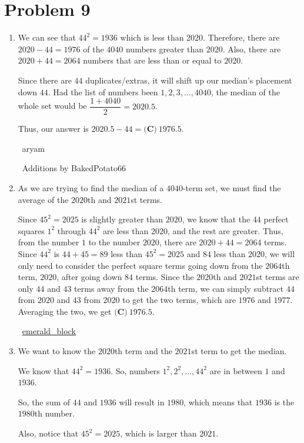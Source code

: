 \documentclass{article}%
\begin{document}
\section*{Problem 9}%
\label{sec:Problem9}%
\begin{enumerate}%
\item%
We can see that $44^2=1936$ which is less than 2020. Therefore, there are $2020-44=1976$ of the $4040$ numbers greater than $2020$. Also, there are $2020+44=2064$ numbers that are less than or equal to $2020$. 

Since there are $44$ duplicates/extras, it will shift up our median's placement down $44$. Had the list of numbers been $1,2,3, \dots, 4040$, the median of the whole set would be $\dfrac{1+4040}{2}=2020.5$. 

Thus, our answer is $2020.5-44=\boxed{\textbf{(C)}\ 1976.5}$.

~aryam

~Additions by BakedPotato66

%
\item%
As we are trying to find the median of a $4040$-term set, we must find the average of the $2020$th and $2021$st terms.

Since $45^2 = 2025$ is slightly greater than $2020$, we know that the $44$ perfect squares $1^2$ through $44^2$ are less than $2020$, and the rest are greater. Thus, from the number $1$ to the number $2020$, there are $2020 + 44 = 2064$ terms. Since $44^2$ is $44 + 45 = 89$ less than $45^2 = 2025$ and $84$ less than $2020$, we will only need to consider the perfect square terms going down from the $2064$th term, $2020$, after going down $84$ terms. Since the $2020$th and $2021$st terms are only $44$ and $43$ terms away from the $2064$th term, we can simply subtract $44$ from $2020$ and $43$ from $2020$ to get the two terms, which are $1976$ and $1977$. Averaging the two, we get $\boxed{\textbf{(C)}\ 1976.5}.$

~\href{/wiki/index.php/User:Emerald_block}{emerald\_block}

%
\item%
We want to know the $2020$th term and the $2021$st term to get the median.

We know that $44^2=1936$. So, numbers $1^2, 2^2, \ldots,44^2$ are in between $1$ and $1936$.

So, the sum of $44$ and $1936$ will result in $1980$, which means that $1936$ is the $1980$th number.

Also, notice that $45^2=2025$, which is larger than $2021$.


\end{enumerate}
\end{document}
